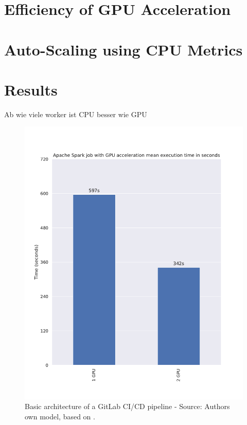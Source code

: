 \section{Efficiency of GPU Acceleration}


\section{Auto-Scaling using CPU Metrics}


\section{Results}
Ab wie viele worker ist CPU besser wie GPU

\begin{figure}[h]
\centering
\includegraphics[scale=0.5]{images/07_evaluation/gpu_spark-job-mean-time}
\caption{Basic architecture of a GitLab CI/CD pipeline - Source: Authors own model, based on \cite{Gitlab2020Docs}.}
\label{fig:04_gitlab_pipeline_basic_arch}
\end{figure}

